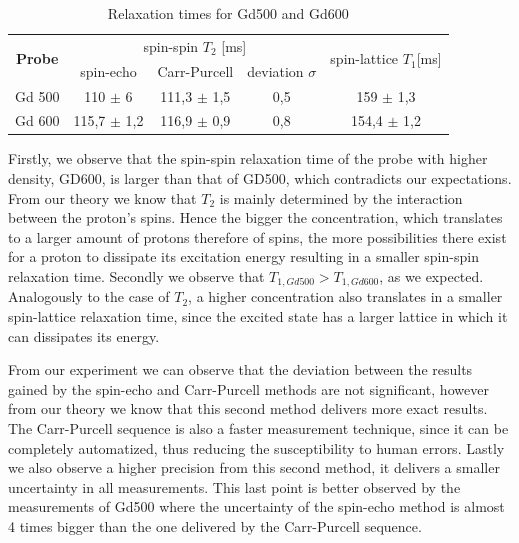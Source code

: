 \begin{table}[!htbp]
 \begin{center}
  \caption{Relaxation times for Gd500 and Gd600}
  \label{tab: relaxation times}
  \begin{tabular}{|c||c|c|c|c|}
	\hline
	\multirow{2}{*}{\textbf{Probe}} & \multicolumn{3}{c}{spin-spin $T_2$ [ms]} &\multirow{2}{*}{ spin-lattice $T_1$[ms]}\\
	& spin-echo & Carr-Purcell & deviation $\sigma$&\\
	\hline
	\hline	
	Gd 500 & 110 $\pm$ 6 & 111,3 $\pm$ 1,5 & 0,5 & 159 $\pm$ 1,3 \\
	Gd 600 & 115,7 $\pm$ 1,2 & 116,9 $\pm$ 0,9 & 0,8 & 154,4 $\pm$ 1,2 \\
	\hline
  \end{tabular}
 \end{center}
\end{table}

Firstly, we observe that the spin-spin relaxation time of the probe with higher density, GD600, is larger than that of GD500, which contradicts our expectations. From our theory we know that $T_2$ is mainly determined by the interaction between the proton's spins. Hence the bigger the concentration, which translates to a larger amount of protons therefore of spins, the  more possibilities there exist for a proton to dissipate its excitation energy resulting in a smaller spin-spin relaxation time. 
Secondly we observe that $T_{1, Gd500} > T_{1,Gd600}$, as we expected. Analogously to the case of $T_2$, a higher concentration also translates in a smaller spin-lattice relaxation time, since the excited state has a larger lattice in which it can dissipates its energy.


From our experiment we can observe that the deviation between the results gained by the spin-echo and Carr-Purcell methods are not significant, however from our theory we know that this second method delivers more exact results. The Carr-Purcell sequence is also a faster measurement technique, since it can be completely automatized, thus reducing the susceptibility to human errors. Lastly we also observe a higher precision from this second method, it delivers a smaller uncertainty in all measurements. This last point is better observed by the measurements of Gd500 where the uncertainty of the spin-echo method is almost 4 times bigger than the one delivered by the Carr-Purcell sequence. 
